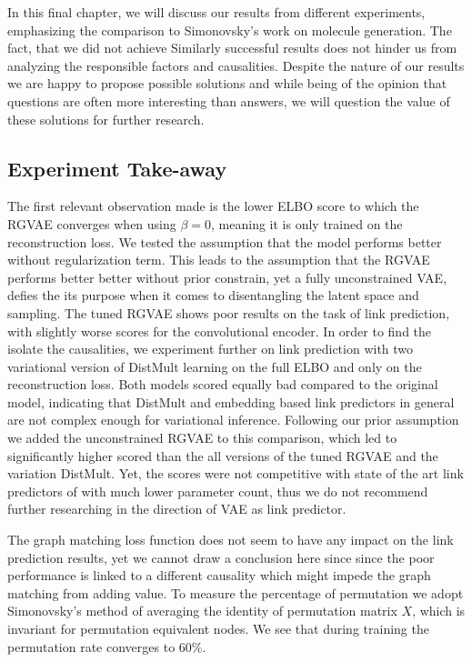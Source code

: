 

In this final chapter, we will discuss our results from different experiments, emphasizing the comparison to Simonovsky's work on molecule generation. The fact, that we did not achieve Similarly successful results does not hinder us from analyzing the responsible factors and causalities. Despite the nature of our results we are happy to propose possible solutions and while being of the opinion that questions are often more interesting than answers, we will question the value of these solutions for further research.

\subsection{Experiment Take-away}


The first relevant observation made is the lower ELBO score to which the RGVAE converges when using $\beta=0$, meaning it is only trained on the reconstruction loss.
We tested the assumption that the model performs better without regularization term. This leads to the assumption that the RGVAE performs better better without prior constrain, yet a fully unconstrained VAE, defies the its purpose when it comes to disentangling the latent space and sampling.
The tuned RGVAE shows poor results on the task of link prediction, with slightly worse scores for the convolutional encoder. In order to find the isolate the causalities, we experiment further on link prediction with two variational version of DistMult learning on the full ELBO and only on the reconstruction loss. Both models scored equally bad compared to the original model, indicating that DistMult and embedding based link predictors in general are not complex enough for variational inference. Following our prior assumption we added the unconstrained RGVAE to this comparison, which led to significantly higher scored than the all versions of the tuned RGVAE and the variation DistMult. Yet, the scores were not competitive with state of the art link predictors of with much lower parameter count, thus we do not recommend further researching in the direction of VAE as link predictor.

The graph matching loss function does not seem to have any impact on the link prediction results, yet we cannot draw a conclusion here since since the poor performance is linked to a different causality which might impede the graph matching from adding value. To measure the percentage of permutation we adopt Simonovsky's method of averaging the identity of permutation matrix $X$, which is invariant for permutation equivalent nodes. We see that during training the permutation rate converges to $60$\%.

